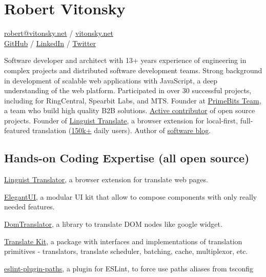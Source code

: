 \documentclass{vitonsky}
\begin{document}
\vitonskyPrintPhoto{}

\section*{\Large{Robert Vitonsky}}

\href{mailto:robert@vitonsky.net}{robert@vitonsky.net} / \href{https://vitonsky.net}{vitonsky.net}\\%
\href{https://github.com/vitonsky}{GitHub} /
\href{https://www.linkedin.com/in/vitonsky}{LinkedIn} /
\href{https://twitter.com/rvitonsky}{Twitter}

\vspace*{12pt}

Software developer and architect with 13+ years experience of engineering in complex projects and distributed software development teams. Strong background in development of scalable web applications with JavaScript, a deep understanding of the web platform. Participated in over 30 successful projects, including for RingCentral, Spearbit Labs, and MTS. Founder at \href{primebits.org}{PrimeBits Team}, a team who build high quality B2B solutions. \href{https://github.com/vitonsky}{Active contributor} of open source projects. Founder of \href{https://linguister.io}{Linguist Translate}, a browser extension for local-first, full-featured translation (\href{https://chrome.google.com/webstore/detail/gbefmodhlophhakmoecijeppjblibmie}{150k+} daily users). Author of \href{https://vitonsky.net/}{software blog}.

\subsection*{Hands-on Coding Expertise (all open source)}

\href{https://github.com/translate-tools/linguist}{Linguist Translator}, a browser
extension for translate web pages.

\href{https://github.com/vitonsky/react-elegant-ui}{ElegantUI}, a
modular UI kit that allow to compose components with only really needed features.

\href{https://github.com/translate-tools/domtranslator}{DomTranslator}, a library to translate DOM nodes like google widget.

\href{https://github.com/translate-tools/core}{Translate Kit}, a package with interfaces and implementations of translation primitives - translators, translate scheduler, batching, cache, multiplexor, etc.

\href{https://github.com/vitonsky/eslint-plugin-paths}{eslint-plugin-paths}, a plugin for ESLint, to force use paths aliases from tsconfig
\end{document}
